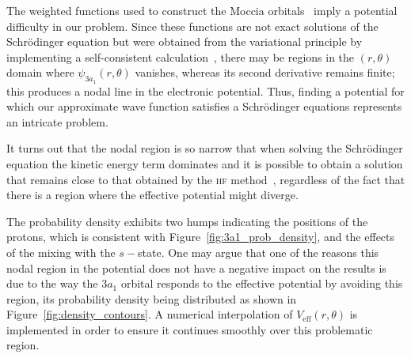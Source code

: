 The weighted functions used to construct the Moccia
orbitals~\cite{Moccia_1964} imply a potential difficulty in our
problem. Since these functions are not exact solutions of the
Schr\"{o}dinger equation but were obtained from the variational
principle by implementing a self-consistent
calculation~\cite{Moccia_JCP_2164}, there may be regions in the
$(r,\theta)$ domain where $\psi_{3a_{1}}(r,\theta)$ vanishes, whereas
its second derivative remains finite; this produces a nodal line in
the electronic potential. Thus, finding a potential for which our
approximate wave function satisfies a Schr\"{o}dinger equations
represents an intricate problem.

It turns out that the nodal region is so narrow that when solving the
Schr\"{o}dinger equation the kinetic energy term dominates and it is
possible to obtain a solution that remains close to that obtained by
the \textsc{hf} method~\cite{Moccia_1964}, regardless of the fact that
there is a region where the effective potential might diverge.

The probability density exhibits two humps indicating the positions of
the protons, which is consistent with
Figure~\ref{fig:3a1_prob_density}, and the effects of the mixing with
the $s-$state. One may argue that one of the reasons this nodal region
in the potential does not have a negative impact on the results is due
to the way the $3a_{1}$ orbital responds to the effective potential by
avoiding this region, its probability density being distributed as
shown in Figure~\ref{fig:density_contours}. A numerical interpolation
of $V_{\mathrm{eff}}(r,\theta)$ is implemented in order to ensure it
continues smoothly over this problematic region.

